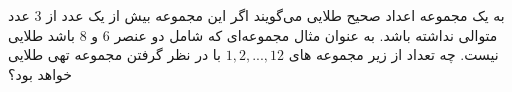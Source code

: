 \EXERCISE
به یک مجموعه اعداد صحیح طلایی می‌گویند اگر این مجموعه بیش از یک عدد از
$3$
عدد متوالی نداشته باشد. به عنوان مثال مجموعه‌ای که شامل دو عنصر
$6$
و
$8$
باشد طلایی نیست. چه تعداد از زیر مجموعه های
${1, 2, ..., 12}$
با در نظر گرفتن مجموعه تهی طلایی خواهد بود؟